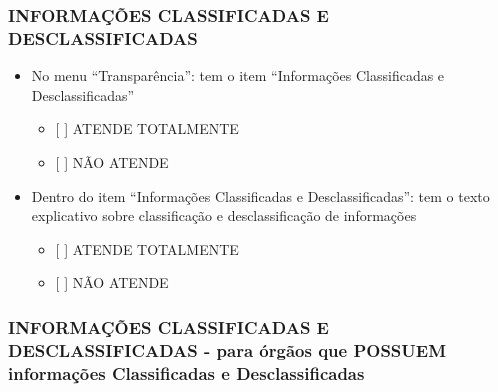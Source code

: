 \documentclass[]{book}
\providecommand{\tightlist}{%
  \setlength{\itemsep}{0pt}\setlength{\parskip}{0pt}}
\begin{document}
\hypertarget{informauxe7uxf5es-classificadas-e-desclassificadas-1}{%
\subsubsection*{INFORMAÇÕES CLASSIFICADAS E DESCLASSIFICADAS}\label{informauxe7uxf5es-classificadas-e-desclassificadas-1}}

\begin{itemize}
\tightlist
\item
  No menu ``Transparência'': tem o item ``Informações Classificadas e Desclassificadas''

  \begin{itemize}
  \tightlist
  \item
    {[} {]} ATENDE TOTALMENTE
  \item
    {[} {]} NÃO ATENDE
  \end{itemize}
\item
  Dentro do item ``Informações Classificadas e Desclassificadas'': tem o texto explicativo sobre classificação e desclassificação de informações

  \begin{itemize}
  \tightlist
  \item
    {[} {]} ATENDE TOTALMENTE
  \item
    {[} {]} NÃO ATENDE
  \end{itemize}
\end{itemize}

\hypertarget{informauxe7uxf5es-classificadas-e-desclassificadas---para-uxf3rguxe3os-que-possuem-informauxe7uxf5es-classificadas-e-desclassificadas}{%
\subsubsection*{INFORMAÇÕES CLASSIFICADAS E DESCLASSIFICADAS - para órgãos que POSSUEM informações Classificadas e Desclassificadas}\label{informauxe7uxf5es-classificadas-e-desclassificadas---para-uxf3rguxe3os-que-possuem-informauxe7uxf5es-classificadas-e-desclassificadas}}
\end{document}
